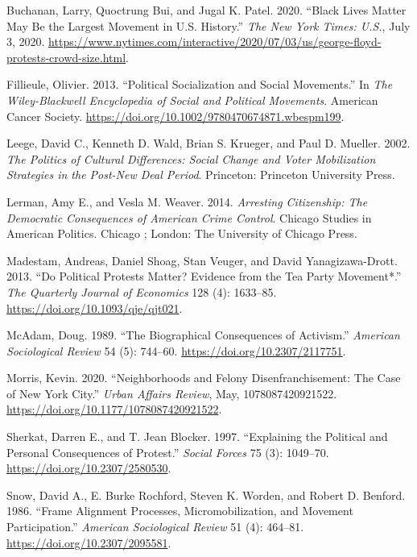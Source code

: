 \documentclass[
  12pt,
]{article}
\newlength{\cslhangindent}
\newenvironment{cslreferences}%
  {\setlength{\parindent}{0pt}%
  \everypar{\setlength{\hangindent}{\cslhangindent}}\ignorespaces}%
  {\par}
\begin{document}
\hypertarget{refs}{}
\begin{cslreferences}
\leavevmode\hypertarget{ref-Buchanan2020}{}%
Buchanan, Larry, Quoctrung Bui, and Jugal K. Patel. 2020. ``Black Lives Matter May Be the Largest Movement in U.S. History.'' \emph{The New York Times: U.S.}, July 3, 2020. \url{https://www.nytimes.com/interactive/2020/07/03/us/george-floyd-protests-crowd-size.html}.

\leavevmode\hypertarget{ref-Fillieule2013}{}%
Fillieule, Olivier. 2013. ``Political Socialization and Social Movements.'' In \emph{The Wiley-Blackwell Encyclopedia of Social and Political Movements}. American Cancer Society. \url{https://doi.org/10.1002/9780470674871.wbespm199}.

\leavevmode\hypertarget{ref-Leege2002}{}%
Leege, David C., Kenneth D. Wald, Brian S. Krueger, and Paul D. Mueller. 2002. \emph{The Politics of Cultural Differences: Social Change and Voter Mobilization Strategies in the Post-New Deal Period}. Princeton: Princeton University Press.

\leavevmode\hypertarget{ref-Lerman2014}{}%
Lerman, Amy E., and Vesla M. Weaver. 2014. \emph{Arresting Citizenship: The Democratic Consequences of American Crime Control}. Chicago Studies in American Politics. Chicago ; London: The University of Chicago Press.

\leavevmode\hypertarget{ref-Madestam2013}{}%
Madestam, Andreas, Daniel Shoag, Stan Veuger, and David Yanagizawa-Drott. 2013. ``Do Political Protests Matter? Evidence from the Tea Party Movement*.'' \emph{The Quarterly Journal of Economics} 128 (4): 1633--85. \url{https://doi.org/10.1093/qje/qjt021}.

\leavevmode\hypertarget{ref-McAdam1989}{}%
McAdam, Doug. 1989. ``The Biographical Consequences of Activism.'' \emph{American Sociological Review} 54 (5): 744--60. \url{https://doi.org/10.2307/2117751}.

\leavevmode\hypertarget{ref-Morris2020}{}%
Morris, Kevin. 2020. ``Neighborhoods and Felony Disenfranchisement: The Case of New York City.'' \emph{Urban Affairs Review}, May, 1078087420921522. \url{https://doi.org/10.1177/1078087420921522}.

\leavevmode\hypertarget{ref-Sherkat1997}{}%
Sherkat, Darren E., and T. Jean Blocker. 1997. ``Explaining the Political and Personal Consequences of Protest.'' \emph{Social Forces} 75 (3): 1049--70. \url{https://doi.org/10.2307/2580530}.

\leavevmode\hypertarget{ref-Snow1986}{}%
Snow, David A., E. Burke Rochford, Steven K. Worden, and Robert D. Benford. 1986. ``Frame Alignment Processes, Micromobilization, and Movement Participation.'' \emph{American Sociological Review} 51 (4): 464--81. \url{https://doi.org/10.2307/2095581}.


\end{cslreferences}
\end{document}
